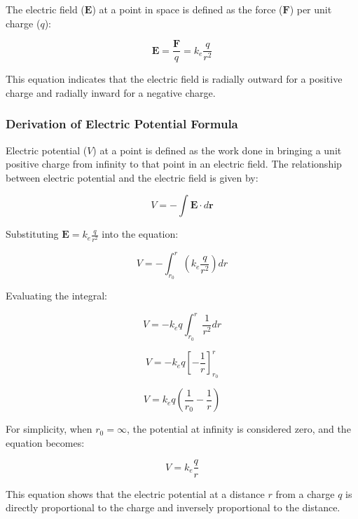 \documentclass[12pt,a4paper]{report}
\begin{document}
The electric field (\(\mathbf{E}\)) at a point in space is defined as the force (\(\mathbf{F}\)) per unit charge (\(q\)):

\begin{equation}
\mathbf{E} = \frac{\mathbf{F}}{q} = k_e \frac{q}{r^2}
\end{equation}

This equation indicates that the electric field is radially outward for a positive charge and radially inward for a negative charge.

\subsubsection{Derivation of Electric Potential Formula}
Electric potential (\(V\)) at a point is defined as the work done in bringing a unit positive charge from infinity to that point in an electric field. The relationship between electric potential and the electric field is given by:

\begin{equation}
V = - \int \mathbf{E} \cdot d\mathbf{r}
\end{equation}

Substituting \(\mathbf{E} = k_e \frac{q}{r^2}\) into the equation:

\begin{equation}
V = - \int_{r_0}^{r} \left( k_e \frac{q}{r^2} \right) dr
\end{equation}

Evaluating the integral:

\begin{equation}
V = - k_e q \int_{r_0}^{r} \frac{1}{r^2} dr
\end{equation}

\begin{equation}
V = - k_e q \left[ -\frac{1}{r} \right]_{r_0}^{r}
\end{equation}

\begin{equation}
V = k_e q \left( \frac{1}{r_0} - \frac{1}{r} \right)
\end{equation}

For simplicity, when \(r_0 = \infty\), the potential at infinity is considered zero, and the equation becomes:

\begin{equation}
V = k_e \frac{q}{r}
\end{equation}

This equation shows that the electric potential at a distance \(r\) from a charge \(q\) is directly proportional to the charge and inversely proportional to the distance.
\end{document}
